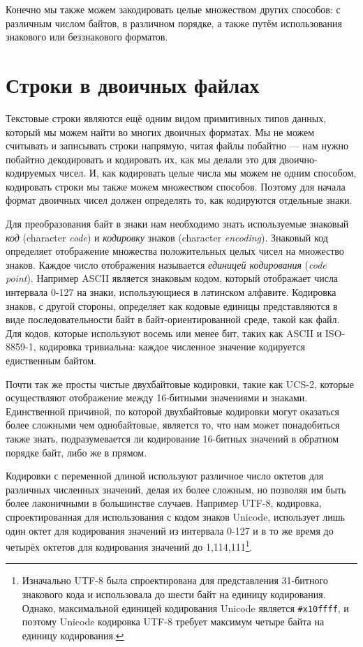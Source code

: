 Конечно мы также можем закодировать целые множеством других способов: с различным числом
байтов, в различном порядке, а также путём использования знакового или беззнакового
форматов.

\section{Строки в двоичных файлах}

Текстовые строки являются ещё одним видом примитивных типов данных, который мы можем найти
во многих двоичных форматах. Мы не можем считывать и записывать строки напрямую, читая
файлы побайтно --- нам нужно побайтно декодировать и кодировать их, как мы делали это для
двоично-кодируемых чисел. И, как кодировать целые числа мы можем не одним способом,
кодировать строки мы также можем множеством способов. Поэтому для начала формат двоичных
чисел должен определять то, как кодируются отдельные знаки.

Для преобразования байт в знаки нам необходимо знать используемые знаковый \textit{код}
(character \textit{code}) и \textit{кодировку} знаков (character
\textit{encoding}). Знаковый код определяет отображение множества положительных целых
чисел на множество знаков. Каждое число отображения называется \textit{единицей
  кодирования} (\textit{code point}). Например ASCII является знаковым кодом, который
отображает числа интервала 0-127 на знаки, использующиеся в латинском алфавите. Кодировка
знаков, с другой стороны, определяет как кодовые единицы представляются в виде
последовательности байт в байт-ориентированной среде, такой как файл. Для кодов, которые
используют восемь или менее бит, таких как ASCII и ISO-8859-1, кодировка тривиальна:
каждое численное значение кодируется едиственным байтом.

Почти так же просты чистые двухбайтовые кодировки, такие как UCS-2, которые осуществляют
отображение между 16-битными значениями и знаками. Единственной причиной, по которой
двухбайтовые кодировки могут оказаться более сложными чем однобайтовые, является то, что
нам может понадобиться также знать, подразумевается ли кодирование 16-битных значений в
обратном порядке байт, либо же в прямом.

Кодировки с переменной длиной используют различное число октетов для различных численных
значений, делая их более сложным, но позволяя им быть более лаконичными в большинстве
случаев. Например UTF-8, кодировка, спроектированная для использования с кодом знаков
Unicode, использует лишь один октет для кодирования значений из интервала 0-127 и в то же
время до четырёх октетов для кодирования значений до 1,114,111\footnote{Изначально UTF-8
  была спроектирована для представления 31-битного знакового кода и использовала до шести
  байт на единицу кодирования. Однако, максимальной единицей кодирования Unicode является
  \lstinline!#x10ffff!, и поэтому Unicode кодировка UTF-8 требует максимум четыре байта на
  единицу кодирования.}.


